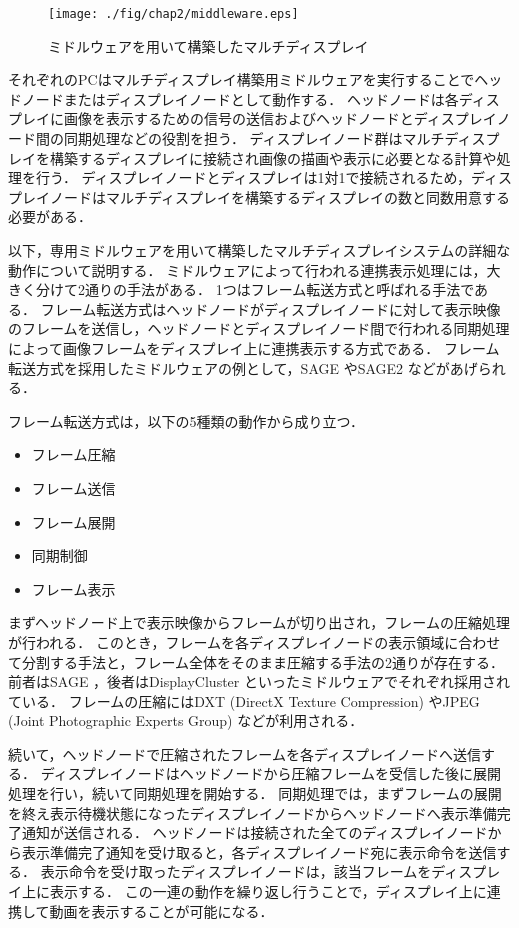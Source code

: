 \begin{figure}[htbp]
 \texttt{[image: ./fig/chap2/middleware.eps]}
 \caption{ミドルウェアを用いて構築したマルチディスプレイ}
 \label{fig_2.2}
\end{figure}

それぞれのPCはマルチディスプレイ構築用ミドルウェアを実行することでヘッドノードまたはディスプレイノードとして動作する．
ヘッドノードは各ディスプレイに画像を表示するための信号の送信およびヘッドノードとディスプレイノード間の同期処理などの役割を担う．
ディスプレイノード群はマルチディスプレイを構築するディスプレイに接続され画像の描画や表示に必要となる計算や処理を行う．
ディスプレイノードとディスプレイは1対1で接続されるため，ディスプレイノードはマルチディスプレイを構築するディスプレイの数と同数用意する必要がある．

以下，専用ミドルウェアを用いて構築したマルチディスプレイシステムの詳細な動作について説明する．
ミドルウェアによって行われる連携表示処理には，大きく分けて2通りの手法がある．
1つはフレーム転送方式と呼ばれる手法である．
フレーム転送方式はヘッドノードがディスプレイノードに対して表示映像のフレームを送信し，ヘッドノードとディスプレイノード間で行われる同期処理によって画像フレームをディスプレイ上に連携表示する方式である．
フレーム転送方式を採用したミドルウェアの例として，SAGE \cite{sage}やSAGE2 \cite{sage2}などがあげられる．

フレーム転送方式は，以下の5種類の動作から成り立つ．

\begin{itemize}
    \item フレーム圧縮
    \item フレーム送信
    \item フレーム展開
    \item 同期制御
    \item フレーム表示
  \end{itemize}

まずヘッドノード上で表示映像からフレームが切り出され，フレームの圧縮処理が行われる．
このとき，フレームを各ディスプレイノードの表示領域に合わせて分割する手法と，フレーム全体をそのまま圧縮する手法の2通りが存在する．
前者はSAGE \cite{sage}，後者はDisplayCluster \cite{displaycluster}といったミドルウェアでそれぞれ採用されている．
フレームの圧縮にはDXT (DirectX Texture Compression) \cite{dxt}やJPEG (Joint Photographic Experts Group) \cite{jpeg}などが利用される．

続いて，ヘッドノードで圧縮されたフレームを各ディスプレイノードへ送信する．
ディスプレイノードはヘッドノードから圧縮フレームを受信した後に展開処理を行い，続いて同期処理を開始する．
同期処理では，まずフレームの展開を終え表示待機状態になったディスプレイノードからヘッドノードへ表示準備完了通知が送信される．
ヘッドノードは接続された全てのディスプレイノードから表示準備完了通知を受け取ると，各ディスプレイノード宛に表示命令を送信する．
表示命令を受け取ったディスプレイノードは，該当フレームをディスプレイ上に表示する．
この一連の動作を繰り返し行うことで，ディスプレイ上に連携して動画を表示することが可能になる．

